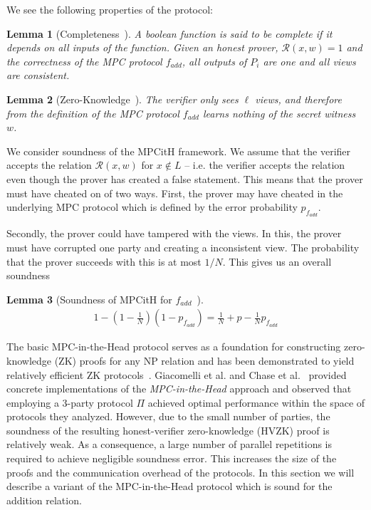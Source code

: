 \documentclass[11pt]{report}
\theoremstyle{definition}
\theoremstyle{plain}
\newtheorem{lemma}{Lemma}[section]
\begin{document}
We see the following properties of the protocol:

\begin{lemma}[Completeness~\cite{ishai2007zero}]\label{def:mpcinth_completeness}
  A boolean function is said to be complete if it depends on all inputs of the function. Given an honest prover, $\mathcal{R}(x,w) = 1$ and the correctness of the MPC protocol $f_{add}$, all outputs of $P_i$ are one and all views are consistent.
\end{lemma}

\begin{lemma}[Zero-Knowledge~\cite{ishai2007zero}]
  The verifier only sees $\ell$ views, and therefore from the definition of the MPC protocol $f_{add}$ learns nothing of the secret witness $w$.
\end{lemma}

We consider soundness of the MPCitH framework. We assume that the verifier accepts the relation $\mathcal{R}(x,w)$ for $x \notin L$ -- i.e. the verifier accepts the relation even though the prover has created a false statement. This means that the prover must have cheated on of two ways. First, the prover may have cheated in the underlying MPC protocol which is defined by the error probability $p_{f_{add}}$.

Secondly, the prover could have tampered with the views. In this, the prover must have corrupted one party and creating a inconsistent view. The probability that the prover succeeds with this is at most $1 / N$. This gives us an overall soundness

\begin{lemma}[Soundness of MPCitH for $f_{add}$~\cite{feneuil2022syndrome}]\label{lem:soundness_mpcinth}
  \begin{align*}
    1 - (1 - \frac{1}{N}) (1 - p_{f_{add}}) = \frac{1}{N} + p - \frac{1}{N} p_{f_{add}}
  \end{align*}
\end{lemma}

The basic MPC-in-the-Head protocol serves as a foundation for constructing zero-knowledge (ZK) proofs for any NP relation and has been demonstrated to yield relatively efficient ZK protocols~\cite{feneuil2022syndrome,baum2020concretely,katz2018improved}. Giacomelli et al. and Chase et al.~\cite{katz2018improved,giacomelli2016zkboo,chase2017post} provided concrete implementations of the \emph{MPC-in-the-Head} approach and observed that employing a 3-party protocol $\Pi$ achieved optimal performance within the space of protocols they analyzed. However, due to the small number of parties, the soundness of the resulting honest-verifier zero-knowledge (HVZK) proof is relatively weak. As a consequence, a large number of parallel repetitions is required to achieve negligible soundness error. This increases the size of the proofs and the communication overhead of the protocols. In this section we will describe a variant of the MPC-in-the-Head protocol which is sound for the addition relation.
\end{document}
